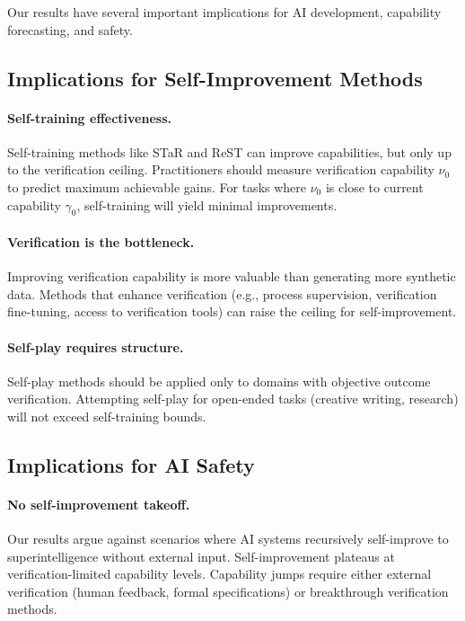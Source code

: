\documentclass{article}
\theoremstyle{definition}
\theoremstyle{remark}
\begin{document}
Our results have several important implications for AI development, capability forecasting, and safety.

\subsection{Implications for Self-Improvement Methods}

\paragraph{Self-training effectiveness.} Self-training methods like STaR and ReST can improve capabilities, but only up to the verification ceiling. Practitioners should measure verification capability \(\nu_0\) to predict maximum achievable gains. For tasks where \(\nu_0\) is close to current capability \(\gamma_0\), self-training will yield minimal improvements.

\paragraph{Verification is the bottleneck.} Improving verification capability is more valuable than generating more synthetic data. Methods that enhance verification (e.g., process supervision, verification fine-tuning, access to verification tools) can raise the ceiling for self-improvement.

\paragraph{Self-play requires structure.} Self-play methods should be applied only to domains with objective outcome verification. Attempting self-play for open-ended tasks (creative writing, research) will not exceed self-training bounds.

\subsection{Implications for AI Safety}

\paragraph{No self-improvement takeoff.} Our results argue against scenarios where AI systems recursively self-improve to superintelligence without external input. Self-improvement plateaus at verification-limited capability levels. Capability jumps require either external verification (human feedback, formal specifications) or breakthrough verification methods.
\end{document}
